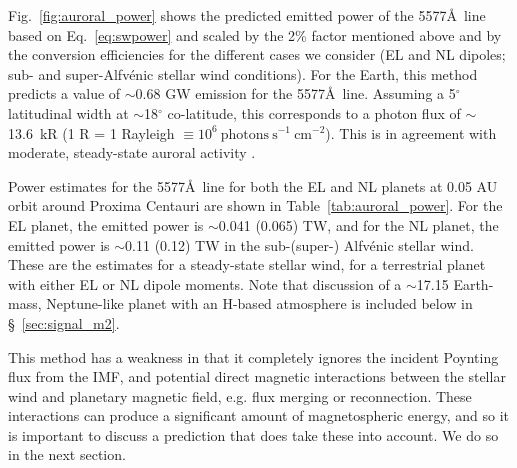 \documentclass{emulateapj}
\begin{document}
Fig.~\ref{fig:auroral_power} shows the predicted emitted power of the 5577\AA\ line based on Eq.~\ref{eq:swpower} and scaled by the 2\% factor mentioned above and by the conversion efficiencies for the different cases we consider (EL and NL dipoles; sub- and super-Alfv\'{e}nic stellar wind conditions). For the Earth, this method predicts a value of $\sim$0.68 GW emission for the 5577\AA\ line. Assuming a 5$^{\circ}$ latitudinal width at $\sim$18$^{\circ}$ co-latitude, this corresponds to a photon flux of $\sim$13.6~kR (1 R = 1 Rayleigh $\equiv 10^{6}\ \mathrm{photons\ s^{-1}\ cm^{-2}}$). This is in agreement with moderate, steady-state auroral activity \cite[e.g.][]{Chamberlain1961,Steele1990}.


Power estimates for the 5577\AA\ line for both the EL and NL planets at 0.05 AU orbit around Proxima Centauri are shown in Table~\ref{tab:auroral_power}. For the EL planet, the emitted power is $\sim$0.041 (0.065) TW, and for the NL planet, the emitted power is $\sim$0.11 (0.12) TW in the sub-\mbox{(super-)} Alfv\'{e}nic stellar wind. These are the estimates for a steady-state stellar wind, for a terrestrial planet with either EL or NL dipole moments. Note that discussion of a $\sim$17.15 Earth-mass, Neptune-like planet with an H-based atmosphere is included below in \S~\ref{sec:signal_m2}.

This method has a weakness in that it completely ignores the incident Poynting flux from the IMF, and potential direct magnetic interactions between the stellar wind and planetary magnetic field, e.g. flux merging or reconnection. These interactions can produce a significant amount of magnetospheric energy, and so it is important to discuss a prediction that does take these into account. We do so in the next section.
\end{document}
